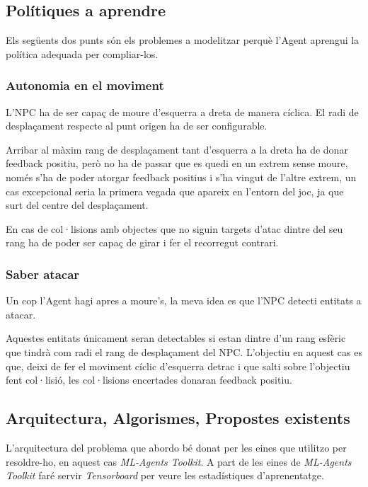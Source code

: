 \documentclass{article}
\begin{document}
    \subsection{Polítiques a aprendre}
   Els següents dos punts són els problemes a modelitzar perquè l'Agent aprengui la política adequada per compliar-los.
    
    \subsubsection{Autonomia en el moviment}
    
    L'NPC ha de ser capaç de moure d'esquerra a dreta de manera cíclica. El radi de desplaçament respecte al punt origen ha de ser configurable.

    Arribar al màxim rang de desplaçament tant d'esquerra a la dreta ha de donar feedback positiu, però no ha de passar que es quedi en un extrem sense moure, només s'ha de poder atorgar feedback positius i s'ha vingut de l'altre extrem, un cas excepcional seria la primera vegada que apareix en l'entorn del joc, ja que surt del centre del desplaçament.
    
    En cas de col·lisions amb objectes que no siguin targets d'atac dintre del seu rang ha de poder ser capaç de girar i fer el recorregut contrari.
    
    \subsubsection{Saber atacar}
    
    Un cop l'Agent hagi apres a moure's, la meva idea es que l’NPC detecti entitats a atacar.
    
    Aquestes entitats únicament seran detectables si estan dintre d'un rang esfèric que tindrà com radi el rang de desplaçament del NPC. L'objectiu en aquest cas es que, deixi de fer el moviment cíclic d'esquerra detrac i que salti sobre l'objectiu fent col·lisió, les col·lisions encertades donaran feedback positiu.
    
    \newpage
    
    \subsection{Arquitectura, Algorismes, Propostes existents}
    
    L'arquitectura del problema que abordo bé donat per les eines que utilitzo per resoldre-ho, en aquest cas \textit{ML-Agents Toolkit}. A part de les eines de \textit{ML-Agents Toolkit} faré servir \textit{Tensorboard} per veure les estadístiques d'aprenentatge.
\end{document}
